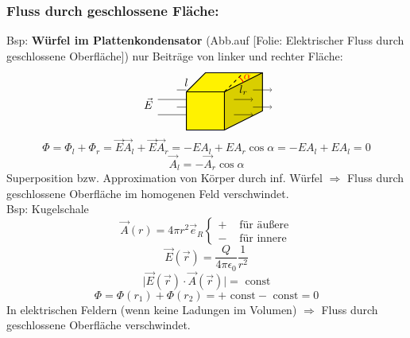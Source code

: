 \documentclass[titlepage,12pt,a4paper,ngerman]{report}
\newcommand{\folie}[1]{\color{gray}[Folie: #1]\color{black}}
\begin{document}
\subsubsection{Fluss durch geschlossene Fläche:}
Bsp: \textbf{Würfel im Plattenkondensator} (Abb.auf \folie{Elektrischer Fluss durch geschlossene Oberfläche}) nur Beiträge von linker und rechter Fläche:
$$
\begin{tikzpicture}[scale=.6]
\draw[thick,draw=black,fill=yellow] (0,0)--(1,1)--(4,1)--(4,-1)--(2,-2)--(0,-2)--(0,0);
\draw[draw=none,fill=black,opacity=.15](2,0)--(4,1)--(4,-1)--(2,-2)--(2,0);
\draw[thick,draw=black](0,0)--(2,0)--(2,-2);
\draw[thick,draw=black] (2,0)--(4,1);
\draw[dashed,thick] (2,0) -- (3,1);
\draw[thick,draw=red] (3,.5) arc (25:55:.7cm);
\node[red] at (3.2,.8) {$ \alpha $};
\node at (0,.5) {$ l $};
\node at (3,.1) {$ l_r $};
\draw (-.5,.1)--(0,.1);
\draw (-1.5,-.4)--(0,-.4);
\draw (-.5,-.8)--(0,-.8);
\draw (-1.5,-1.2)--(0,-1.2);
\draw[->] (3.5,.1)--(4.5,.1);
\draw[->] (2.5,-.4)--(3.5,-.4);
\draw[->] (3.5,-.8)--(4.5,-.8);
\draw[->] (2.5,-1.2)--(3.5,-1.2);
\node at (-2,-.6) {$ \vec{E} $};
\end{tikzpicture}
$$
$$ \Phi = \Phi_l + \Phi_r = \vec{E} \vec{A}_l + \vec{E} \vec{A}_r = -E A_l + E A_r \cos \alpha = -EA_l + E A_l= 0$$
$$ \vec{A}_l = - \vec{A}_r \cos \alpha$$
Superposition bzw. Approximation von Körper durch inf. Würfel $\Rightarrow$ Fluss durch geschlossene Oberfläche im homogenen Feld verschwindet.\\
Bsp: Kugelschale
$$\vec{A}(r) = 4 \pi r^2 \vec{e}_R \left\{\begin{array}{ll}
+ & \textrm{ für äußere} \\
- & \textrm{ für innere}
\end{array}\right.$$
$$\vec{E}(\vec{r}) = \frac{Q}{4\pi\epsilon_0} \frac{1}{r^2} $$
$$\bigg | \vec{E}(\vec{r}) \cdot \vec{A}(\vec{r}) \bigg | = \textrm{ const}$$
$$\Phi = \Phi(r_1) + \Phi(r_2) = + \textrm{ const} - \textrm{ const} = 0$$
In elektrischen Feldern (wenn keine Ladungen im Volumen) $\Rightarrow $ Fluss durch geschlossene Oberfläche verschwindet.
\end{document}
